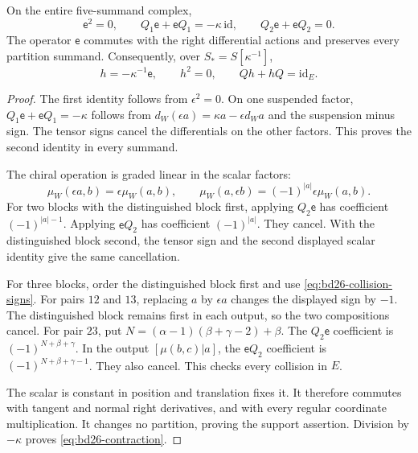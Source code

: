 \begin{lemma}\label{lem:bd26-scalar-homotopy}
On the entire five-summand complex,
\begin{equation}\label{eq:bd26-homotopy-level}
 \mathsf e^2=0,\qquad
 Q_1\mathsf e+\mathsf e Q_1=-\kappa\,\mathrm{id},\qquad
 Q_2\mathsf e+\mathsf e Q_2=0.
\end{equation}
The operator $\mathsf e$ commutes with the right differential actions and preserves every partition summand.
Consequently, over $S_*=S[\kappa^{-1}]$,
\begin{equation}\label{eq:bd26-contraction}
 h=-\kappa^{-1}\mathsf e,
 \qquad h^2=0,\qquad Qh+hQ=\mathrm{id}_E.
\end{equation}
\end{lemma}
\begin{proof}
The first identity follows from $\epsilon^2=0$.
On one suspended factor, $Q_1\mathsf e+\mathsf e Q_1=-\kappa$ follows from
$d_W(\epsilon a)=\kappa a-\epsilon d_Wa$ and the suspension minus sign.
The tensor signs cancel the differentials on the other factors.
This proves the second identity in every summand.

The chiral operation is graded linear in the scalar factors:
\[
 \mu_W(\epsilon a,b)=\epsilon\mu_W(a,b),\qquad
 \mu_W(a,\epsilon b)=(-1)^{|a|}\epsilon\mu_W(a,b).
\]
For two blocks with the distinguished block first, applying $Q_2\mathsf e$ has coefficient $(-1)^{|a|-1}$.
Applying $\mathsf e Q_2$ has coefficient $(-1)^{|a|}$.
They cancel.
With the distinguished block second, the tensor sign and the second displayed scalar identity give the same cancellation.

For three blocks, order the distinguished block first and use \eqref{eq:bd26-collision-signs}.
For pairs $12$ and $13$, replacing $a$ by $\epsilon a$ changes the displayed sign by $-1$.
The distinguished block remains first in each output, so the two compositions cancel.
For pair $23$, put $N=(\alpha-1)(\beta+\gamma-2)+\beta$.
The $Q_2\mathsf e$ coefficient is $(-1)^{N+\beta+\gamma}$.
In the output $[\mu(b,c)|a]$, the $\mathsf e Q_2$ coefficient is
$(-1)^{N+\beta+\gamma-1}$.
They also cancel.
This checks every collision in $E$.

The scalar is constant in position and translation fixes it.
It therefore commutes with tangent and normal right derivatives, and with every regular coordinate multiplication.
It changes no partition, proving the support assertion.
Division by $-\kappa$ proves \eqref{eq:bd26-contraction}.
\end{proof}

